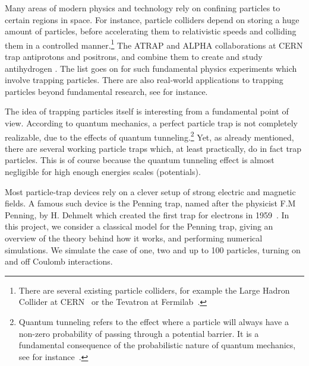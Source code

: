 \documentclass[english,notitlepage,reprint]{revtex4-2}  %
\begin{document}



Many areas of modern physics and technology rely on confining particles to certain regions in space. For instance, particle colliders depend on storing a huge amount of particles, before accelerating them to relativistic speeds and colliding them in a controlled manner.\footnote{There are several existing particle colliders, for example the Large Hadron Collider at CERN~\cite{cernCollider} or the Tevatron at Fermilab~\cite{tevatron}.} The ATRAP and ALPHA collaborations at CERN trap antiprotons and positrons, and combine them to create and study antihydrogen \cite{atrapCERN,alphaCERN}. The list goes on for such fundamental physics experiments which involve trapping particles. There are also real-world applications to trapping particles beyond fundamental research, see for instance.~\cite{marshallFTICR,MakarovOrbitrap,ionImplantation}

The idea of trapping particles itself is interesting from a fundamental point of view. According to quantum mechanics, a perfect particle trap is not completely realizable, due to the effects of quantum tunneling.\footnote{Quantum tunneling refers to the effect where a particle will always have a non-zero probability of passing through a potential barrier. It is a fundamental consequence of the probabilistic nature of quantum mechanics, see for instance~\cite{griffithsQM}.} Yet, as already mentioned, there are several working particle traps which, at least practically, do in fact trap particles. This is of course because the quantum tunneling effect is almost negligible for high enough energies scales (potentials).~\cite{griffithsQM} 

Most particle-trap devices rely on a clever setup of strong electric and magnetic fields. A famous such device is the Penning trap, named after the physicist F.M Penning, by H. Dehmelt which created the first trap for electrons in 1959~\cite{decaroli2021iontraps}. In this project, we consider a classical model for the Penning trap, giving an overview of the theory behind how it works, and performing numerical simulations. We simulate the case of one, two and up to 100 particles, turning on and off Coulomb interactions. 
\end{document}

